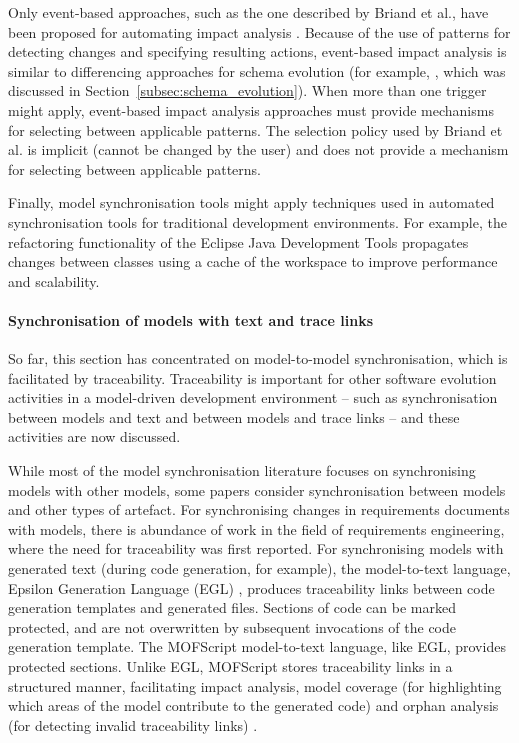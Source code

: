 Only \cc event-based approaches, such as the one described by Briand et al., have been proposed for automating impact analysis \cite{winkler09survey}. Because of the use of patterns for detecting changes and specifying resulting actions, event-based impact analysis is similar to differencing approaches for schema evolution (for example, \cite{lerner00model}, which was discussed in Section~\ref{subsec:schema_evolution}). When more than one trigger might apply, event-based impact analysis approaches must provide mechanisms for selecting between applicable patterns. The \cc selection policy used by Briand et al. is implicit (cannot be changed by the user) and does not provide a mechanism for selecting between applicable patterns.

Finally, model synchronisation tools might apply techniques used in automated synchronisation tools for traditional development environments. For example, the refactoring functionality of the Eclipse Java Development Tools \cite{fuhrer07refactoring} propagates changes between classes using a cache of the workspace to improve performance and scalability.


\paragraph{Synchronisation of models with text and trace links}
So far, this section has concentrated on model-to-model synchronisation, which is facilitated by traceability. Traceability is important for other software evolution activities in a model-driven development environment -- such as synchronisation between models and text and between models and trace links -- and these activities are now discussed.

While most of the model synchronisation literature focuses on synchronising models with other models, some papers consider synchronisation between models and other types of artefact. For synchronising changes in requirements documents with models, there is abundance of work in the field of requirements engineering, where the need for traceability was first reported. For synchronising models with generated text (during code generation, for example), the model-to-text language, Epsilon Generation Language (EGL) \cite{rose08egl}, produces traceability links between code generation templates and generated files. Sections of code can be marked protected, and are not overwritten by subsequent invocations of the code generation template. The MOFScript model-to-text language, like EGL, provides protected sections. Unlike EGL, MOFScript stores traceability links in a structured manner, facilitating impact analysis, model coverage (for highlighting which areas of the model contribute to the generated code) and orphan analysis (for detecting invalid traceability links) \cite{olsen07traceability}.

